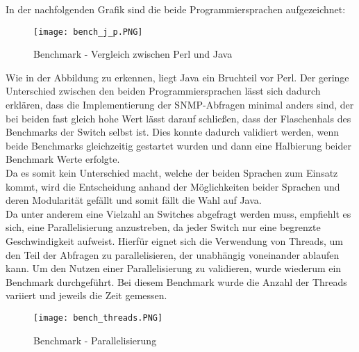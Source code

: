 In der nachfolgenden Grafik sind die beide Programmiersprachen aufgezeichnet:\\

\begin{figure}[H]
\centering
\texttt{[image: bench\_j\_p.PNG]}
\caption{Benchmark - Vergleich zwischen Perl und Java}
\label{fig:benchperljava}
\end{figure}

Wie in der Abbildung zu erkennen, liegt Java ein Bruchteil vor Perl. Der geringe Unterschied zwischen den beiden Programmiersprachen lässt sich dadurch erklären, dass die Implementierung der SNMP-Abfragen minimal anders sind, der bei beiden fast gleich hohe Wert lässt darauf schließen, dass der Flaschenhals des Benchmarks der Switch selbst ist. Dies konnte dadurch validiert werden, wenn beide Benchmarks  gleichzeitig gestartet wurden und dann eine Halbierung beider Benchmark Werte erfolgte.\\
Da es somit kein Unterschied macht, welche der beiden Sprachen zum Einsatz kommt, wird die Entscheidung anhand der Möglichkeiten beider Sprachen und deren Modularität gefällt und somit fällt die Wahl auf Java.\\

Da unter anderem eine Vielzahl an Switches abgefragt werden muss, empfiehlt es sich, eine Parallelisierung anzustreben, da jeder Switch nur eine begrenzte Geschwindigkeit aufweist.
Hierfür eignet sich die Verwendung von Threads, um den Teil der Abfragen zu parallelisieren, der unabhängig voneinander ablaufen kann.
Um den Nutzen einer Parallelisierung zu validieren, wurde wiederum ein Benchmark durchgeführt. Bei diesem Benchmark wurde die Anzahl der Threads variiert und jeweils die Zeit gemessen.\\

\begin{figure}[H]
\centering
\texttt{[image: bench\_threads.PNG]}
\caption{Benchmark - Parallelisierung}
\label{fig:benchparallel}
\end{figure}

